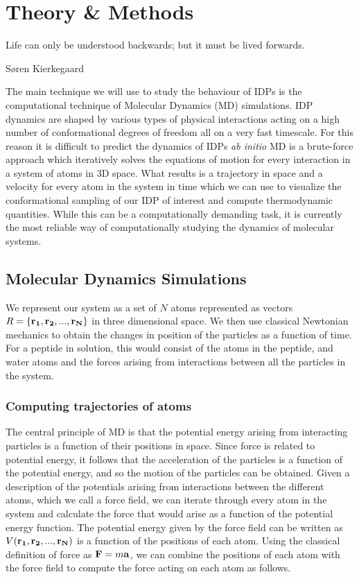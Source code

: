 \chapter{Theory \& Methods}
\epigraph{Life can only be understood backwards; but it must be lived forwards.}{S{\o}ren Kierkegaard}

The main technique we will use to study the behaviour of IDPs is the computational technique of Molecular Dynamics (MD) simulations. IDP dynamics are shaped by various types of physical interactions acting on a high number of conformational degrees of freedom all on a very fast timescale. For this reason it is difficult to predict the dynamics of IDPs {\it ab initio} MD is a brute-force approach which iteratively solves the equations of motion for every interaction in a system of atoms in 3D space.  What results is a trajectory in space and a velocity for every atom in the system in time which we can use to visualize the conformational sampling of our IDP of interest and compute thermodynamic quantities. While this can be a computationally demanding task, it is currently the most reliable way of computationally studying the dynamics of molecular systems. 

\section{Molecular Dynamics Simulations}

We represent our system as a set of $N$ atoms represented as  vectors $R = \{\mathbf{r_1}, \mathbf{r_2}, ... , \mathbf{r_N}\}$ in three dimensional space. We then use classical Newtonian mechanics to obtain the changes in position of the particles as a function of time. For a peptide in solution, this would consist of the atoms in the peptide, and water atoms and the forces arising from interactions between all the particles in the system. 

\subsection{Computing trajectories of atoms}

The central principle of MD is that the potential energy arising from interacting particles is a function of their positions in space. Since force is related to potential energy, it follows that the acceleration of the particles is a function of the potential energy, and so the motion of the particles can be obtained. Given a description of the potentials arising from interactions between the different atoms, which we call a force field, we can iterate through every atom in the system and calculate the force that would arise as a function of the potential energy function. The potential energy given by the force field can be written as $V(\mathbf{r_1}, \mathbf{r_2}, ..., \mathbf{r_N})$ is a function of the positions of each atom. Using the classical definition of force as $\mathbf{F} = m\mathbf{a}$, we can combine the positions of each atom with the force field to compute the force acting on each atom as follows.  

